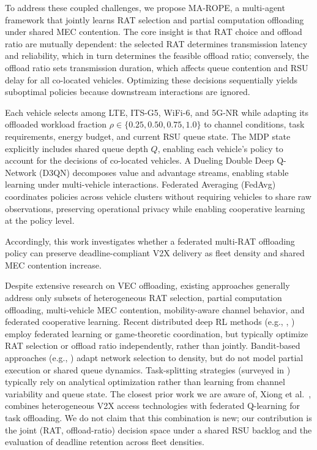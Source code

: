 To address these coupled challenges, we propose MA-ROPE, a multi-agent framework that jointly learns RAT selection and partial computation offloading under shared MEC contention. The core insight is that RAT choice and offload ratio are mutually dependent: the selected RAT determines transmission latency and reliability, which in turn determines the feasible offload ratio; conversely, the offload ratio sets transmission duration, which affects queue contention and RSU delay for all co-located vehicles. Optimizing these decisions sequentially yields suboptimal policies because downstream interactions are ignored.

Each vehicle selects among LTE, ITS-G5, WiFi-6, and 5G-NR while adapting its offloaded workload fraction $\rho \in \{0.25, 0.50, 0.75, 1.0\}$ to channel conditions, task requirements, energy budget, and current RSU queue state. The MDP state explicitly includes shared queue depth $Q$, enabling each vehicle's policy to account for the decisions of co-located vehicles. A Dueling Double Deep Q-Network (D3QN) decomposes value and advantage streams, enabling stable learning under multi-vehicle interactions. Federated Averaging (FedAvg) coordinates policies across vehicle clusters without requiring vehicles to share raw observations, preserving operational privacy while enabling cooperative learning at the policy level.

Accordingly, this work investigates whether a federated multi-RAT offloading policy can preserve deadline-compliant V2X delivery as fleet density and shared MEC contention increase.

Despite extensive research on VEC offloading, existing approaches generally address only subsets of heterogeneous RAT selection, partial computation offloading, multi-vehicle MEC contention, mobility-aware channel behavior, and federated cooperative learning. Recent distributed deep RL methods (e.g., \cite{zhao2024}, \cite{guo2026}) employ federated learning or game-theoretic coordination, but typically optimize RAT selection or offload ratio independently, rather than jointly. Bandit-based approaches (e.g., \cite{haq2026}) adapt network selection to density, but do not model partial execution or shared queue dynamics. Task-splitting strategies (surveyed in \cite{mach2017}) typically rely on analytical optimization rather than learning from channel variability and queue state. The closest prior work we are aware of, Xiong et al.~\cite{xiong2021}, combines heterogeneous V2X access technologies with federated Q-learning for task offloading. We do not claim that this combination is new; our contribution is the joint (RAT, offload-ratio) decision space under a shared RSU backlog and the evaluation of deadline retention across fleet densities.

